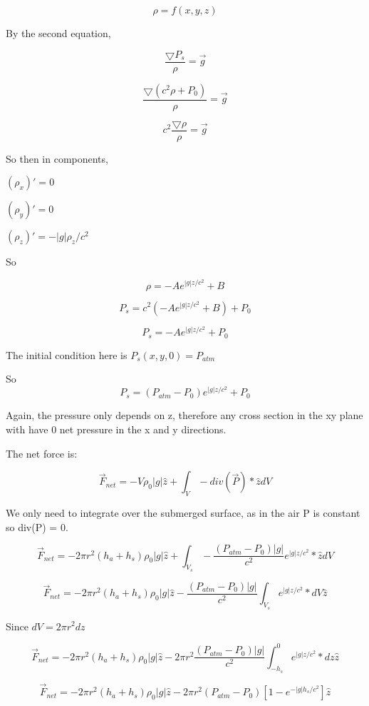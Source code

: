 \documentclass{article}
\begin{document}
$$\rho = f(x, y, z)$$

By the second equation, 

$$\frac{\bigtriangledown P_s}{\rho} = \vec{g}$$

$$\frac{\bigtriangledown (c^2\rho + P_0)}{\rho} = \vec{g}$$

$$c^2\frac{\bigtriangledown \rho}{\rho} = \vec{g}$$

So then in components, 

$(\rho_x)' = 0$

$(\rho_y)' = 0$

$(\rho_z)' = -|g|\rho_z/c^2 $

So

$$\rho = -Ae^{|g|z/c^2} + B $$

$$P_s = c^2(-Ae^{|g|z/c^2} + B) + P_0$$

$$P_s = -Ae^{|g|z/c^2} + P_0$$

The initial condition here is  $P_s(x, y, 0) = P_{atm}$

So $$P_s = (P_{atm}-P_0)e^{|g|z/c^2} + P_0$$

Again, the pressure only depends on z, therefore any cross section in the xy plane with have 0 net pressure in the x and y directions. 

The net force is:

$$\vec{F}_{net} =  - V \rho_0|g| \hat{z} + \int_{V} -div(\vec{P})*\hat{z}  dV $$

We only need to integrate over the submerged surface, as in the air P is constant so div(P) = 0.

$$\vec{F}_{net} =  - 2\pi r^2(h_a + h_s) \rho_0|g| \hat{z} + \int_{V_s} -\frac{(P_{atm}-P_0)|g|}{c^2}e^{|g|z/c^2}*\hat{z}  dV $$

$$\vec{F}_{net} =  - 2\pi r^2(h_a + h_s) \rho_0|g| \hat{z} -\frac{(P_{atm}-P_0)|g|}{c^2} \int_{V_s} e^{|g|z/c^2}* dV\hat{z}  $$

Since $dV = 2 \pi r^2 dz$

$$\vec{F}_{net} =  - 2\pi r^2(h_a + h_s) \rho_0|g| \hat{z} -2\pi r^2\frac{(P_{atm}-P_0)|g|}{c^2} \int_{-h_s}^0 e^{|g|z/c^2}* dz\hat{z}  $$

$$\vec{F}_{net} =  -2 \pi r^2(h_a + h_s) \rho_0|g| \hat{z} -2\pi r^2(P_{atm}-P_0) [1 - e^{-|g|h_s/c^2}]\hat{z}  $$
\end{document}
